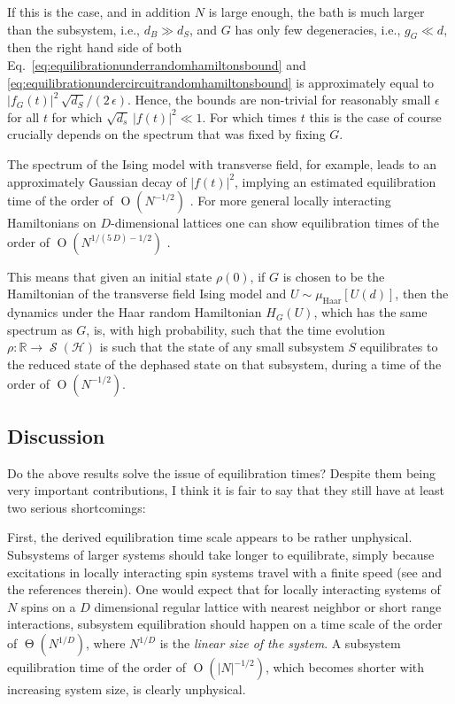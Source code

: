 \documentclass[a4paper,12pt,listof=totoc,index=totoc,bibliography=totoc,headsepline=false,headings=normal,BCOR16.153846mm,DIV12,headinclude,twoside,cleardoublepage=empty,numbers=noenddot,final]{scrreprt}
\theoremstyle{mystyle}
\numberwithin{equation}{section}
\numberwithin{figure}{section}
\numberwithin{lemma}{section}
\numberwithin{theorem}{section}
\numberwithin{corollary}{section}
\numberwithin{definition}{section}
\numberwithin{conjecture}{section}
\numberwithin{observation}{section}
\newcommand{\+}{\mkern2mu}
\newcommand{\texteqref}[1]{Eq.~\eqref{#1}}
\newcommand{\oftype}{\colon}
\renewcommand{\H}{H}
\newcommand{\muhaar}{\mu_{\mathrm{Haar}}}
\DeclareMathOperator{\landauO}{O}
\DeclareMathOperator{\landauTheta}{\Theta}
\DeclareMathOperator{\1}{\mathds{1}}
\DeclareMathOperator{\Qst}{\mathcal{S}}
\newcommand{\mc}[1]{\mathcal{#1}}
\newcommand{\mcH}{\mc{H}}
\newcommand{\mb}[1]{\mathbb{#1}}
\newcommand{\R}{\mb{R}}
\begin{document}
If this is the case, and in addition $N$ is large enough, the bath is much larger than the subsystem, i.e., $d_B \gg d_S$, and $G$ has only few degeneracies, i.e., $g_G \ll d$, then the right hand side of both \texteqref{eq:equilibrationunderrandomhamiltonsbound} and \eqref{eq:equilibrationundercircuitrandomhamiltonsbound} is approximately equal to $|f_G(t)|^2\,\sqrt{d_S}/(2\,\epsilon)$.
Hence, the bounds are non-trivial for reasonably small $\epsilon$ for all $t$ for which $\sqrt{d_s}\,|f(t)|^2 \ll 1$. 
For which times $t$ this is the case of course crucially depends on the spectrum that was fixed by fixing $G$.

The spectrum of the Ising model with transverse field, for example, leads to an approximately Gaussian decay of $|f(t)|^2$, implying an estimated equilibration time of the order of $\landauO(N^{-1/2})$ \cite{1108.0374}.
For more general locally interacting Hamiltonians on $D$-dimensional lattices one can show equilibration times of the order of $\landauO(N^{1/(5\,D)-1/2})$ \cite{1112.5295v1}.

This means that given an initial state $\rho(0)$, if $G$ is chosen to be the Hamiltonian of the transverse field Ising model and $U \sim \muhaar[U(d)]$, then the dynamics under the Haar random Hamiltonian $\H_G(U)$, which has the same spectrum as $G$, is, with high probability, such that the time evolution $\rho\oftype\R\to\Qst(\mcH)$ is such that the state of any small subsystem $S$ equilibrates to the reduced state of the dephased state on that subsystem, during a time of the order of $\landauO(N^{-1/2})$.


\subsection*{Discussion}
%
Do the above results solve the issue of equilibration times?
Despite them being very important contributions, I think it is fair to say that they still have at least two serious shortcomings:

First, the derived equilibration time scale appears to be rather unphysical.
Subsystems of larger systems should take longer to equilibrate, simply because excitations in locally interacting spin systems travel with a finite speed (see \cite{Kliesch2013} and the references therein).
One would expect that for locally interacting systems of $N$ spins on a $D$ dimensional regular lattice with nearest neighbor or short range interactions, subsystem equilibration should happen on a time scale of the order of $\landauTheta(N^{1/D})$, where $N^{1/D}$ is the \emph{linear size of the system}. 
A subsystem equilibration time of the order of $\landauO(|N|^{-1/2})$, which becomes shorter with increasing system size, is clearly unphysical.
\end{document}
